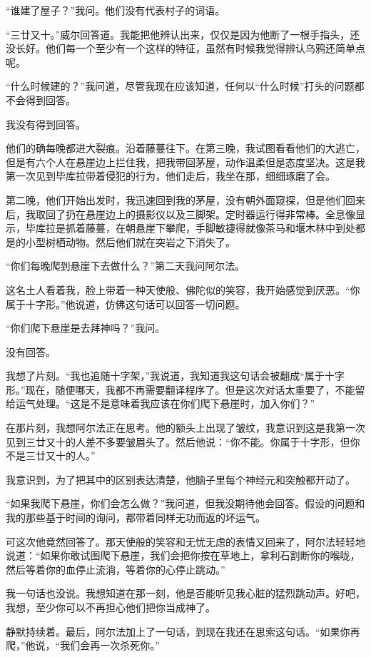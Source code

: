 \documentclass[AutoFakeBold=true]{book}
\begin{document}
``谁建了屋子？''我问。他们没有代表村子的词语。

``三廿又十。''威尔回答道。我能把他辨认出来，仅仅是因为他断了一根手指头，还没长好。他们每一个至少有一个这样的特征，虽然有时候我觉得辨认乌鸦还简单点呢。

``什么时候建的？''我问道，尽管我现在应该知道，任何以``什么时候''打头的问题都不会得到回答。

我没有得到回答。

他们的确每晚都进大裂痕。沿着藤蔓往下。在第三晚，我试图看看他们的大逃亡，但是有六个人在悬崖边上拦住我，把我带回茅屋，动作温柔但是态度坚决。这是我第一次见到毕库拉带着侵犯的行为，他们走后，我坐在那，细细琢磨了会。

第二晚，他们开始出发时，我迅速回到我的茅屋，没有朝外面窥探，但是他们回来后，我取回了扔在悬崖边上的摄影仪以及三脚架。定时器运行得非常棒。全息像显示，毕库拉是抓着藤蔓，在朝悬崖下攀爬，手脚敏捷得就像茶马和堰木林中到处都是的小型树栖动物。然后他们就在突岩之下消失了。

``你们每晚爬到悬崖下去做什么？''第二天我问阿尔法。

这名土人看着我，脸上带着一种天使般、佛陀似的笑容，我开始感觉到厌恶。``你属于十字形。''他说道，仿佛这句话可以回答一切问题。

``你们爬下悬崖是去拜神吗？''我问。

没有回答。

我想了片刻。``我也追随十字架，''我说道，我知道我这句话会被翻成``属于十字形。''现在，随便哪天，我都不再需要翻译程序了。但是这次对话太重要了，不能留给运气处理。``这是不是意味着我应该在你们爬下悬崖时，加入你们？''

在那片刻，我想阿尔法正在思考。他的额头上出现了皱纹，我意识到这是我第一次见到三廿又十的人差不多要皱眉头了。然后他说：``你不能。你属于十字形，但你不是三廿又十的人。''

我意识到，为了把其中的区别表达清楚，他脑子里每个神经元和突触都开动了。

``如果我爬下悬崖，你们会怎么做？''我问道，但我没期待他会回答。假设的问题和我的那些基于时间的询问，都带着同样无功而返的坏运气。

可这次他竟然回答了。那天使般的笑容和无忧无虑的表情又回来了，阿尔法轻轻地说道：``如果你敢试图爬下悬崖，我们会把你按在草地上，拿利石割断你的喉咙，然后等着你的血停止流淌，等着你的心停止跳动。''

我一句话也没说。我想知道在那一刻，他是否能听见我心脏的猛烈跳动声。好吧，我想，至少你可以不再担心他们把你当成神了。

静默持续着。最后，阿尔法加上了一句话，到现在我还在思索这句话。``如果你再爬，''他说，``我们会再一次杀死你。''
\end{document}
